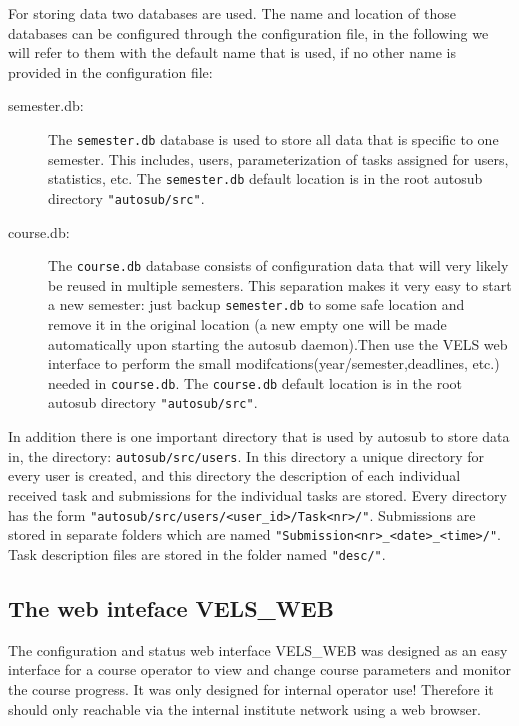 For storing data two databases are used. The name and location of those databases can be configured
through the configuration file, in the following we will refer to them with the default
name that is used, if no other name is provided in the configuration file:
\begin{description}
\item [semester.db: ] The {\tt semester.db} database is used to store all data that is
    specific to one semester. This includes, users, parameterization of tasks assigned
    for users, statistics, etc. The {\tt semester.db} default location is in the root
    autosub directory {\tt "autosub/src"}.
\item [course.db: ] The {\tt course.db} database consists of configuration data that will
    very likely be reused in multiple semesters. This separation makes it very easy
    to start a new semester: just backup {\tt semester.db} to some safe location and
    remove it in the original location (a new empty one will be made automatically upon 
    starting the autosub daemon).Then use the VELS web interface to perform the small 
    modifcations(year/semester,deadlines, etc.) needed in {\tt course.db}. The
    {\tt course.db} default location is in the root autosub directory {\tt "autosub/src"}.
\end{description}

In addition there is one important directory that is used by autosub to store data in,
the directory: {\tt autosub/src/users}. In this directory a unique directory for every
user is created, and this directory the description of each individual received task and submissions 
for the individual tasks are stored. Every directory has the form 
{\tt "autosub/src/users/<user\_id>/Task<nr>/"}. Submissions are stored in separate folders which are named 
{\tt "Submission<nr>\_<date>\_<time>/"}. Task description files are stored in the folder named {\tt "desc/"}.

\subsection{The web inteface VELS\_WEB} \label{sub:VELS_WEB}

The configuration and status web interface VELS\_WEB was designed as an easy interface
for a course operator to view and change course parameters and monitor the course progress.
It was only designed for internal operator use! Therefore it should only reachable via 
the internal institute network using a web browser.

